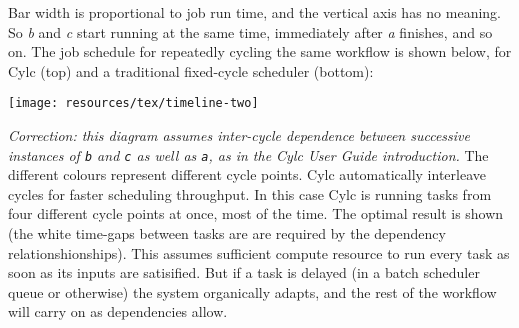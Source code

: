 Bar width is proportional to job run time, and the vertical axis has no
meaning.  So {\em b} and {\em c} start running at the same time,
immediately after {\em a} finishes, and so on.  The job schedule for repeatedly
cycling the same workflow is shown below, for Cylc (top) and a traditional
fixed-cycle scheduler (bottom):

\begin{center}
    \texttt{[image: resources/tex/timeline-two]}
\end{center}
{\em Correction: this diagram assumes inter-cycle dependence between
successive instances of \lstinline=b= and \lstinline=c= as well as
\lstinline=a=, as in the Cylc User Guide introduction.}
The different colours represent different cycle points.  Cylc automatically
interleave cycles for faster scheduling throughput. In this case Cylc is
running tasks from four different cycle points at once, most of the time. The
optimal result is shown (the white time-gaps between tasks are are required by
the dependency relationshionships). This assumes sufficient compute resource to
run every task as soon as its inputs are satisified. But if a task is delayed
(in a batch scheduler queue or otherwise) the system organically adapts, and
the rest of the workflow will carry on as dependencies allow.
